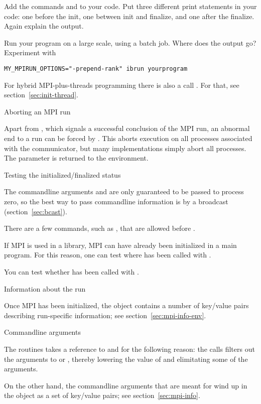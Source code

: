 \begin{exercise}
  \label{ex:hello2}
  Add the commands  and 
  to your code. Put three different print statements in your code: one before the init,
  one between init and finalize, and one after the finalize. Again explain the output.

  Run your program on a large scale, using a batch job.
  Where does the output go?
  Experiment with
\begin{verbatim}
MY_MPIRUN_OPTIONS="-prepend-rank" ibrun yourprogram
\end{verbatim}
\end{exercise}

\begin{remark}
  For hybrid MPI-plus-threads programming there is also a call
  . For that, see
  section~\ref{sec:init-thread}.
\end{remark}

 {Aborting an MPI run}

Apart from , which signals a successful
conclusion of the MPI run, an abnormal end to a run can be forced by
.
%
This aborts execution on all processes associated with the communicator,
but many implementations simply abort all processes. The  parameter
is returned to the environment.

 {Testing the initialized/finalized status}

The commandline arguments  and  are only guaranteed to
be passed to process zero, so the best way to pass commandline information
is by a broadcast (section~\ref{sec:bcast}).

There are a few commands, such as
, that are allowed before
.

If MPI is used in a library, MPI can have already been initialized in a main program.
For this reason, one can test where  has been called with
%
.

You can test whether  has been called with
%
.

 {Information about the run}

Once MPI has been initialized, the  object
contains a number of key/value pairs describing run-specific
information; see section~\ref{sec:mpi-info-env}.

 {Commandline arguments}

The  routines takes a reference to 
and  for the following reason: the  calls
filters out the arguments to  or ,
thereby lowering the value of  and elimitating some of the 
arguments.

On the other hand, the commandline arguments that are meant for 
wind up in the  object as a set of
key/value pairs; see section~\ref{sec:mpi-info}.

